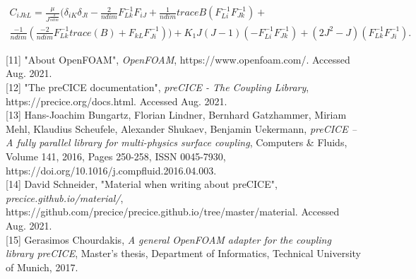 \documentclass[oneside,11pt,times]{book}
\begin{document}
\begin{equation}
\begin{split}
C_{iJkL} = \frac{\mu}{J^{\frac{2}{ndim}}}(\delta_{iK}\delta_{Jl}
-\frac{2}{ndim}F_{Lk}^{-1}F_{iJ}+\frac{1}{ndim}traceB(F_{Li}^{-1}F_{Jk}^{-1})+ \\
\frac{-1}{ndim}(\frac{-2}{ndim}F_{Lk}^{-1}trace(B)+F_{kL}F_{Ji}^{-1})) +K_{1}J(J-1)(-F_{Li}^{-1}F_{Jk}^{-1})+(2J^{2}-J)(F_{Lk}^{-1}F_{Ji}^{-1}).
\end{split}
\end{equation}





[11] "About OpenFOAM", \emph{OpenFOAM}, https://www.openfoam.com/. Accessed Aug. 2021.\\

[12] "The preCICE documentation", \emph{preCICE - The Coupling Library},\\ https://precice.org/docs.html. Accessed Aug. 2021.\\

[13] Hans-Joachim Bungartz, Florian Lindner, Bernhard Gatzhammer, Miriam Mehl, Klaudius Scheufele, Alexander Shukaev, Benjamin Uekermann, \emph{preCICE – A fully parallel library for multi-physics surface coupling}, Computers \& Fluids, Volume 141, 2016, Pages 250-258, ISSN 0045-7930, \\https://doi.org/10.1016/j.compfluid.2016.04.003.\\

[14] David Schneider, "Material when writing about preCICE", \emph{precice.github.io/material/},\\ https://github.com/precice/precice.github.io/tree/master/material. Accessed Aug. 2021.\\

[15] Gerasimos Chourdakis,  \emph{A general OpenFOAM adapter for the coupling library preCICE}, Master's thesis, Department of Informatics, Technical University of Munich, 2017.\\
\end{document}
